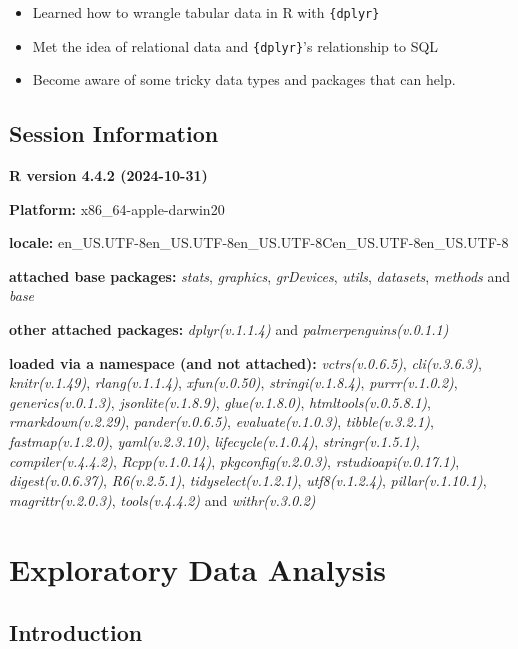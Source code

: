 \documentclass[
  letterpaper,
  DIV=11,
  numbers=noendperiod]{scrreprt}
\begin{document}
\begin{itemize}
\item
  Learned how to wrangle tabular data in R with \texttt{\{dplyr\}}
\item
  Met the idea of relational data and \texttt{\{dplyr\}}'s relationship
  to SQL
\item
  Become aware of some tricky data types and packages that can help.
\end{itemize}

\section{Session Information}\label{session-information-6}

\textbf{R version 4.4.2 (2024-10-31)}

\textbf{Platform:} x86\_64-apple-darwin20

\textbf{locale:}
en\_US.UTF-8\textbar\textbar en\_US.UTF-8\textbar\textbar en\_US.UTF-8\textbar\textbar C\textbar\textbar en\_US.UTF-8\textbar\textbar en\_US.UTF-8

\textbf{attached base packages:} \emph{stats}, \emph{graphics},
\emph{grDevices}, \emph{utils}, \emph{datasets}, \emph{methods} and
\emph{base}

\textbf{other attached packages:} \emph{dplyr(v.1.1.4)} and
\emph{palmerpenguins(v.0.1.1)}

\textbf{loaded via a namespace (and not attached):}
\emph{vctrs(v.0.6.5)}, \emph{cli(v.3.6.3)}, \emph{knitr(v.1.49)},
\emph{rlang(v.1.1.4)}, \emph{xfun(v.0.50)}, \emph{stringi(v.1.8.4)},
\emph{purrr(v.1.0.2)}, \emph{generics(v.0.1.3)},
\emph{jsonlite(v.1.8.9)}, \emph{glue(v.1.8.0)},
\emph{htmltools(v.0.5.8.1)}, \emph{rmarkdown(v.2.29)},
\emph{pander(v.0.6.5)}, \emph{evaluate(v.1.0.3)},
\emph{tibble(v.3.2.1)}, \emph{fastmap(v.1.2.0)}, \emph{yaml(v.2.3.10)},
\emph{lifecycle(v.1.0.4)}, \emph{stringr(v.1.5.1)},
\emph{compiler(v.4.4.2)}, \emph{Rcpp(v.1.0.14)},
\emph{pkgconfig(v.2.0.3)}, \emph{rstudioapi(v.0.17.1)},
\emph{digest(v.0.6.37)}, \emph{R6(v.2.5.1)}, \emph{tidyselect(v.1.2.1)},
\emph{utf8(v.1.2.4)}, \emph{pillar(v.1.10.1)}, \emph{magrittr(v.2.0.3)},
\emph{tools(v.4.4.2)} and \emph{withr(v.3.0.2)}

\chapter{Exploratory Data Analysis}\label{edav-analysis}

\section{Introduction}\label{introduction-3}
\end{document}

